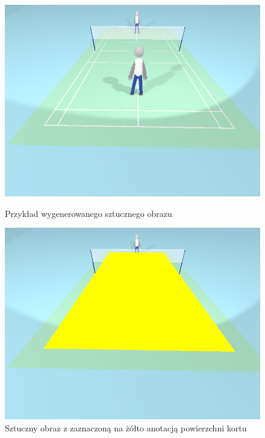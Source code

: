 \begin{figure}[!htb]
    \includegraphics[width=\linewidth]{./fake.jpg}
    \caption{Przykład wygenerowanego sztucznego obrazu}
  \endminipage\hfill
    \includegraphics[width=\linewidth]{./fake_annotated.jpg}
    \caption{Sztuczny obraz z zaznaczoną na żółto anotacją powierzchni kortu}
  \endminipage\hfill
\end{figure}
